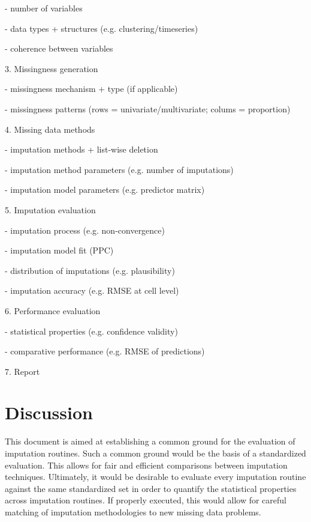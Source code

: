 \documentclass[bimj,fleqn]{w-art}
\begin{document}
- number of variables

- data types + structures (e.g. clustering/timeseries)

- coherence between variables

3. Missingness generation

- missingness mechanism + type (if applicable)

- missingness patterns (rows = univariate/multivariate; colums = proportion)

4. Missing data methods

- imputation methods + list-wise deletion

- imputation method parameters (e.g. number of imputations)

- imputation model parameters (e.g. predictor matrix)

5. Imputation evaluation

- imputation process (e.g. non-convergence)

- imputation model fit (PPC)

- distribution of imputations (e.g. plausibility)

- imputation accuracy (e.g. RMSE at cell level)

6. Performance evaluation

- statistical properties (e.g. confidence validity)

- comparative performance (e.g. RMSE of predictions)

7. Report



\section{Discussion}

This document is aimed at establishing a common ground for the evaluation of imputation routines. Such a common ground would be the basis of a standardized evaluation. This allows for fair and efficient comparisons between imputation techniques. Ultimately, it would be desirable to evaluate every imputation routine against the same standardized set in order to quantify the statistical properties across imputation routines. If properly executed, this would allow for careful matching of imputation methodologies to new missing data problems. 



\begin{acknowledgement}
\end{acknowledgement}
\vspace*{1pc}
\end{document}
